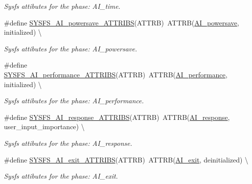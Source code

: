 \begin{DoxyCompactItemize}
\begin{DoxyCompactList}\small\item\em Sysfs attibutes for the phase\+: A\+I\+\_\+time. \end{DoxyCompactList}\item 
\#define \hyperlink{group__sysfs__attrb__init_gaeb59d25e3c5c1bdaae809f8668675a0c}{S\+Y\+S\+F\+S\+\_\+\+A\+I\+\_\+powersave\+\_\+\+A\+T\+T\+R\+I\+BS}(A\+T\+T\+RB)~A\+T\+T\+RB(\hyperlink{AI__gov__phases_8h_a59664fef4d2987410ea13b917756d6aca9a76c12955eedfafb9f63c2794b9442c}{A\+I\+\_\+powersave}, initialized) \textbackslash{}
\begin{DoxyCompactList}\small\item\em Sysfs attibutes for the phase\+: A\+I\+\_\+powersave. \end{DoxyCompactList}\item 
\#define \hyperlink{group__sysfs__attrb__init_gaec2dd8d06cbfc43cb056b1d9657bebaf}{S\+Y\+S\+F\+S\+\_\+\+A\+I\+\_\+performance\+\_\+\+A\+T\+T\+R\+I\+BS}(A\+T\+T\+RB)~A\+T\+T\+RB(\hyperlink{AI__gov__phases_8h_a59664fef4d2987410ea13b917756d6aca8088559d540bc975a4f2cb72fd8ba72b}{A\+I\+\_\+performance}, initialized) \textbackslash{}
\begin{DoxyCompactList}\small\item\em Sysfs attibutes for the phase\+: A\+I\+\_\+performance. \end{DoxyCompactList}\item 
\#define \hyperlink{group__sysfs__attrb__init_ga971760a5656c4eb275a661bd95a9f5f4}{S\+Y\+S\+F\+S\+\_\+\+A\+I\+\_\+response\+\_\+\+A\+T\+T\+R\+I\+BS}(A\+T\+T\+RB)~A\+T\+T\+RB(\hyperlink{AI__gov__phases_8h_a59664fef4d2987410ea13b917756d6aca346eb46ca5be7e36dfa7be441e1be79d}{A\+I\+\_\+response}, user\+\_\+input\+\_\+importance) \textbackslash{}
\begin{DoxyCompactList}\small\item\em Sysfs attibutes for the phase\+: A\+I\+\_\+response. \end{DoxyCompactList}\item 
\#define \hyperlink{group__sysfs__attrb__init_ga4d9477c773ba5f22fe2355ed48ab5276}{S\+Y\+S\+F\+S\+\_\+\+A\+I\+\_\+exit\+\_\+\+A\+T\+T\+R\+I\+BS}(A\+T\+T\+RB)~A\+T\+T\+RB(\hyperlink{AI__gov__phases_8h_a59664fef4d2987410ea13b917756d6aca35e180df2c6d0504f1d2ca890d0e4444}{A\+I\+\_\+exit}, deinitialized) \textbackslash{}
\begin{DoxyCompactList}\small\item\em Sysfs attibutes for the phase\+: A\+I\+\_\+exit. \end{DoxyCompactList}\end{DoxyCompactItemize}


